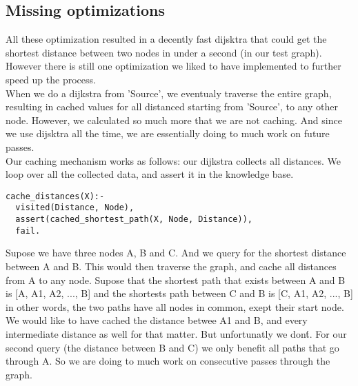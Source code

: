 \subsection{Missing optimizations}
All these optimization resulted in a decently fast dijsktra that could get the shortest distance between two nodes in under a second (in our test graph). However there is still one optimization we liked to have implemented to further speed up the process.\\
When we do a dijkstra from 'Source', we eventualy traverse the entire graph, resulting in cached values for all distanced starting from 'Source', to any other node. However, we calculated so much more that we are not caching. And since we use dijsktra all the time, we are essentially doing to much work on future passes.\\
Our caching mechanism works as follows: our dijkstra collects all distances. We loop over all the collected data, and assert it in the knowledge base.
\begin{lstlisting}
cache_distances(X):-
  visited(Distance, Node),
  assert(cached_shortest_path(X, Node, Distance)),
  fail.
\end{lstlisting}

Supose we have three nodes A, B and C. And we query for the shortest distance between A and B. This would then traverse the graph, and cache all distances from A to any node. Supose that the shortest path that exists between A and B is [A, A1, A2, ..., B] and the shortests path between C and B is [C, A1, A2, ..., B] in other words, the two paths have all nodes in common, exept their start node. We would like to have cached the distance betwee A1 and B, and every intermediate distance as well for that matter. But unfortunatly we don\'t. For our second query (the distance between B and C) we only benefit all paths that go through A. So we are doing to much work on consecutive passes through the graph.
